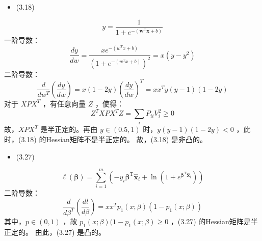 \documentclass[UTF8,a4paper,AutoFakeBold,AutoFakeSlant]{article}
\begin{document}
\subsection{}

\begin{itemize}
  \item (3.18)
\end{itemize}

\begin{equation*}
  y=\frac{1}{1+e^{-\left(\boldsymbol{w}^{\mathrm{T}} \boldsymbol{x}+b\right)}}
\end{equation*}
一阶导数：
\begin{equation*}
  \frac{d y}{d w}=\frac{x e^{-\left(w^{T} x+b\right)}}{\left(1+e^{-\left(w^{T} x+b\right)}\right)^{2}}=x\left(y-y^{2}\right)
\end{equation*}
二阶导数：
\begin{equation*}
  \frac{d}{d w^{T}}\left(\frac{d y}{d w}\right)=x(1-2 y)\left(\frac{d y}{d w}\right)^{T}=x x^{T} y(y-1)(1-2 y)
\end{equation*}
对于 $ XPX^T $ ，有任意向量 $Z$ ，使得：
\begin{equation*}
  Z^{T} X P X^{T} Z=\sum_{i} P_{i i} V_{i}^{2} \geq 0
\end{equation*}
故，$ XPX^T $ 是半正定的。再由 $ y \in (0.5, 1) $ 时，$ y(y-1)(1-2 y) < 0 $ ，此时，(3.18) 的Hessian矩阵不是半正定的。
故，(3.18) 是非凸的。

\begin{itemize}
  \item (3.27)
\end{itemize}

\begin{equation*}
  \ell(\boldsymbol{\beta})=\sum_{i=1}^{m}\left(-y_{i} \boldsymbol{\beta}^{\mathrm{T}} \hat{\boldsymbol{x}}_{i}+\ln \left(1+e^{\boldsymbol{\beta}^{\mathrm{T}} \hat{\boldsymbol{x}}_{i}}\right)\right)
\end{equation*}
二阶导数：
\begin{equation*}
  \frac{d}{d \beta^{T}}\left(\frac{d l}{d \beta}\right)=x x^{T} p_1(x ; \beta)(1-p_1(x ; \beta))
\end{equation*}
其中，$p\in(0,1)$ ，故 $ p_1(x ; \beta)(1-p_1(x ; \beta) \geq 0 $ ，(3.27) 的Hessian矩阵是半正定的。
由此，(3.27) 是凸的。



\subsection{}
\end{document}
